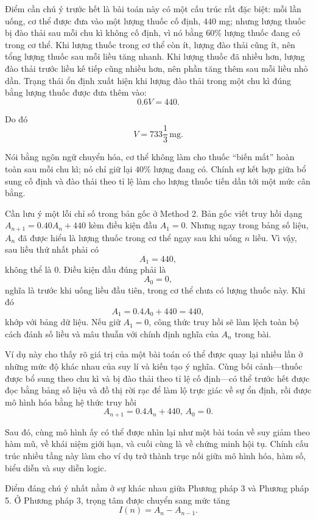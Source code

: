   {
    \vspace{.5\baselineskip}
    Điểm cần chú ý trước hết là bài toán này có một cấu trúc rất đặc biệt: mỗi lần uống, cơ thể được đưa vào một lượng thuốc cố định, $440$ mg; nhưng lượng thuốc bị đào thải sau mỗi chu kì không cố định, vì nó bằng $60\%$ lượng thuốc đang có trong cơ thể. Khi lượng thuốc trong cơ thể còn ít, lượng đào thải cũng ít, nên tổng lượng thuốc sau mỗi liều tăng nhanh. Khi lượng thuốc đã nhiều hơn, lượng đào thải trước liều kế tiếp cũng nhiều hơn, nên phần tăng thêm sau mỗi liều nhỏ dần. Trạng thái ổn định xuất hiện khi lượng đào thải trong một chu kì đúng bằng lượng thuốc được đưa thêm vào:
    $$
    0.6V=440.
    $$

    Do đó
    $$
    V=733\frac{1}{3}\, \text{mg}.
    $$

    Nói bằng ngôn ngữ chuyển hóa, cơ thể không làm cho thuốc ``biến mất'' hoàn toàn sau mỗi chu kì; nó chỉ giữ lại $40\%$ lượng đang có. Chính sự kết hợp giữa bổ sung cố định và đào thải theo tỉ lệ làm cho lượng thuốc tiến dần tới một mức cân bằng.

    Cần lưu ý một lỗi chỉ số trong bản gốc ở Method 2. Bản gốc viết truy hồi dạng $A_{n+1}=0.40A_n+440$ kèm điều kiện đầu $A_1=0$. Nhưng ngay trong bảng số liệu, $A_n$ đã được hiểu là lượng thuốc trong cơ thể ngay sau khi uống $n$ liều. Vì vậy, sau liều thứ nhất phải có
    $$
    A_1=440,
    $$
    không thể là $0$. Điều kiện đầu đúng phải là
    $$
    A_0=0,
    $$
    nghĩa là trước khi uống liều đầu tiên, trong cơ thể chưa có lượng thuốc này. Khi đó
    $$
    A_1=0.4A_0+440=440,
    $$
    khớp với bảng dữ liệu. Nếu giữ $A_1=0$, công thức truy hồi sẽ làm lệch toàn bộ cách đánh số liều và mâu thuẫn với chính định nghĩa của $A_n$ trong bài.

    Ví dụ này cho thấy rõ giá trị của một bài toán có thể được quay lại nhiều lần ở những mức độ khác nhau của suy lí và kiến tạo ý nghĩa. Cùng bối cảnh---thuốc được bổ sung theo chu kì và bị đào thải theo tỉ lệ cố định---có thể trước hết được đọc bằng bảng số liệu và đồ thị rời rạc để làm lộ trực giác về sự ổn định, rồi được mô hình hóa bằng hệ thức truy hồi
    $$
    A_{n+1}=0.4A_n+440,\, A_0=0.
    $$

    Sau đó, cùng mô hình ấy có thể được nhìn lại như một bài toán về suy giảm theo hàm mũ, về khái niệm giới hạn, và cuối cùng là về chứng minh hội tụ. Chính cấu trúc nhiều tầng này làm cho ví dụ trở thành trục nối giữa mô hình hóa, hàm số, biểu diễn và suy diễn logic.

    Điểm đáng chú ý nhất nằm ở sự khác nhau giữa Phương pháp 3 và Phương pháp 5. Ở Phương pháp 3, trọng tâm được chuyển sang mức tăng
    $$
    I(n)=A_n-A_{n-1}.
    $$

}
